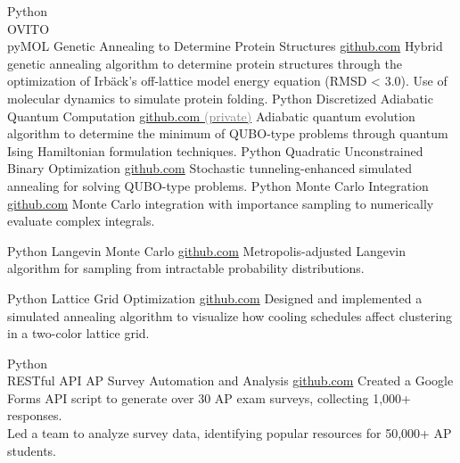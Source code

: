\documentclass[9pt]{developercv} %
\begin{document}
\begin{entrylist}
    \entry
		{Python \\ OVITO \\ pyMOL }
		{Genetic Annealing to Determine Protein Structures}
		{\href{https://github.com/lonelyneutrin0/Protein-Structure-Prediction}{github.com}}
		{Hybrid genetic annealing algorithm to determine protein structures through the optimization of Irbäck's off-lattice model energy equation (RMSD < 3.0). Use of molecular dynamics to simulate protein folding.}
	\entry
		{Python}
		{Discretized Adiabatic Quantum Computation}
		{\href{https://github.com/lonelyneutrin0/QA}{github.com \textcolor{gray}{(private)}}}
		{Adiabatic quantum evolution algorithm to determine the minimum of QUBO-type problems through quantum Ising Hamiltonian formulation techniques.}
	\entry
		{Python}
		{Quadratic Unconstrained Binary Optimization}
		{\href{https://github.com/lonelyneutrin0/qubo}{github.com}}
		{Stochastic tunneling-enhanced simulated annealing for solving QUBO-type problems.}
	\entry
		{Python}
		{Monte Carlo Integration}
		{\href{https://github.com/lonelyneutrin0/MNI}{github.com}}
		{Monte Carlo integration with importance sampling to numerically evaluate complex integrals.}
	
	\entry
		{Python}
		{Langevin Monte Carlo}
		{\href{https://github.com/lonelyneutrin0/LMC}{github.com}}
		{Metropolis-adjusted Langevin algorithm for sampling from intractable probability distributions.}
	
	\entry
		{Python}
		{Lattice Grid Optimization}
		{\href{https://github.com/lonelyneutrin0/lattice_grid}{github.com}}
		{Designed and implemented a simulated annealing algorithm to visualize how cooling schedules affect clustering in a two-color lattice grid.}
	
	\entry
	{Python \\ RESTful API}
	{AP Survey Automation and Analysis}
	{\href{https://github.com/lonelyneutrin0/APSurveyAutomation}{github.com}}
	{Created a Google Forms API script to generate over 30 AP exam surveys, collecting 1,000+ responses.\\Led a team to analyze survey data, identifying popular resources for 50,000+ AP students.}
	\end{entrylist}
	
\end{document}
